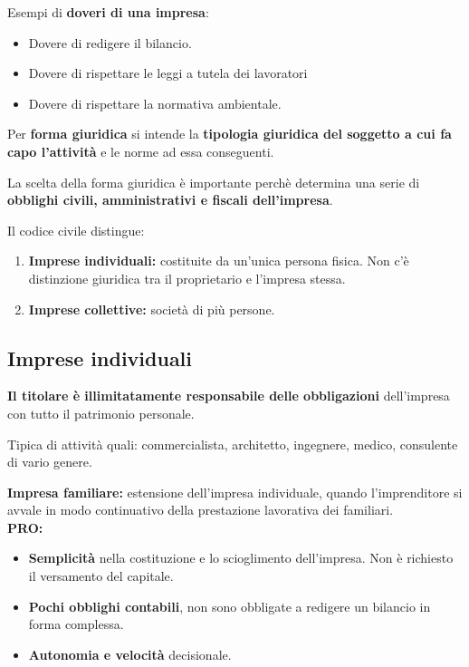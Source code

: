 \documentclass[../main.tex]{subfiles}
\begin{document}
Esempi di \textbf{doveri di una impresa}:
\begin{itemize}
\item Dovere di redigere il bilancio.
\item Dovere di rispettare le leggi a tutela dei lavoratori
\item Dovere di rispettare la normativa ambientale.
\end{itemize}

Per \textbf{forma giuridica} si intende la \textbf{tipologia giuridica del soggetto a cui fa capo l'attività} e le norme ad essa conseguenti.

La scelta della forma giuridica è importante perchè determina una serie di \textbf{obblighi civili, amministrativi e fiscali dell'impresa}.

Il codice civile distingue:

\begin{enumerate}
\item \textbf{Imprese individuali:} costituite  da un'unica persona fisica. Non c'è distinzione giuridica tra il proprietario e l'impresa stessa.

\item \textbf{Imprese collettive:} società di più persone.
\end{enumerate}

\subsection{Imprese individuali}

\textbf{Il titolare è illimitatamente responsabile delle obbligazioni} dell'impresa con tutto il patrimonio personale.

Tipica di attività quali: commercialista, architetto, ingegnere, medico, consulente di vario genere.

\textbf{Impresa familiare:} estensione dell'impresa individuale, quando l'imprenditore si avvale in modo continuativo della prestazione lavorativa dei familiari. \\

\textbf{PRO:}
\begin{itemize}
\item \textbf{Semplicità} nella costituzione e lo scioglimento dell'impresa. Non è richiesto il versamento del capitale.

\item \textbf{Pochi obblighi contabili}, non sono obbligate a redigere un bilancio in forma complessa.

\item \textbf{Autonomia e velocità} decisionale.
\end{itemize}
\end{document}
